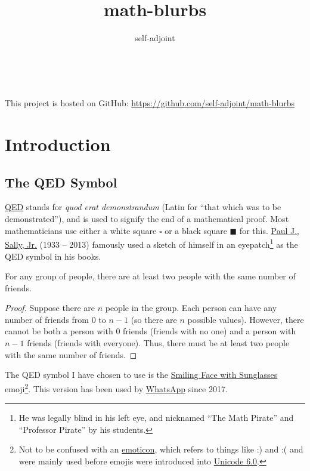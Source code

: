 \documentclass{article}
\title{math-blurbs}
\author{self-adjoint}
\date{\DTMToday}
\makeatletter
\renewcommand{\maketitle}{%
    \thispagestyle{empty}
    \begin{center}
        \null\vspace{2mm}
        {\fontsize{24}{28}\sffamily\bfseries\selectfont\@title}\\
        \vspace{6mm}
        {\fontsize{20}{24}\sffamily\selectfont\@author}
    \end{center}
}
\makeatother
\begin{document}
\maketitle

\VersionTimestamp

This project is hosted on GitHub: \url{https://github.com/self-adjoint/math-blurbs}

\section{Introduction}

\subsection{The QED Symbol}

\href{https://mathworld.wolfram.com/QED.html}{QED} stands for \emph{quod erat demonstrandum} (Latin for ``that which was to be demonstrated''), and is used to signify the end of a mathematical proof. Most mathematicians use either a white square $\square$ or a black square $\blacksquare$ for this. \href{https://news.uchicago.edu/story/paul-j-sally-jr-influential-mathematician-and-educator-1933-2013}{Paul J., Sally, Jr.} (1933 -- 2013) famously used a sketch of himself in an eyepatch\footnote{He was legally blind in his left eye, and nicknamed ``The Math Pirate'' and ``Professor Pirate'' by his students.} as the QED symbol in his books.

\begin{theorem}
    For any group of people, there are at least two people with the same number of friends.
\end{theorem}
\begin{proof}
    Suppose there are $n$ people in the group. Each person can have any number of friends from $0$ to $n-1$ (so there are $n$ possible values). However, there cannot be both a person with $0$ friends (friends with no one) and a person with $n-1$ friends (friends with everyone). Thus, there must be at least two people with the same number of friends.
\end{proof}

The QED symbol I have chosen to use is the \href{https://emojipedia.org/smiling-face-with-sunglasses}{Smiling Face with Sunglasses} emoji\footnote{Not to be confused with an \href{https://www.britannica.com/story/whats-the-difference-between-emoji-and-emoticons}{emoticon}, which refers to things like :) and :( and were mainly used before emojis were introduced into \href{https://emojipedia.org/unicode-6.0}{Unicode 6.0}.}. This version has been used by \href{https://www.whatsapp.com/}{WhatsApp} since 2017.
\end{document}
